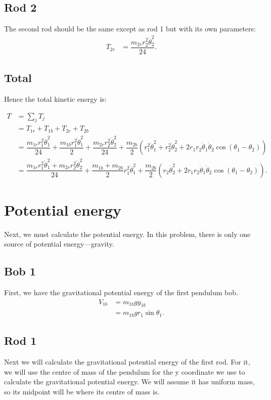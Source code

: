 \documentclass[12pt,a4paper,portrait]{article}
\begin{document}
	\subsection{Rod 2}
	The second rod should be the same except as rod 1 but with its own parameters:
	\begin{align*}
		T_{2r} &= \dfrac{m_{2r} r_2^2\dot{\theta}_2^2}{24}.
	\end{align*}
	
	\subsection{Total}
	Hence the total kinetic energy is:
	
	\begin{align*}
		T &= \sum_j T_j \\
		&= T_{1r} + T_{1b} + T_{2r} + T_{2b} \\
		&= \dfrac{m_{1r}r_1^2\dot{\theta}_1^2}{24} + \dfrac{m_{1b} r_1^2 \dot{\theta}_1^2}{2} + \dfrac{m_{2r} r_2^2\dot{\theta}_2^2}{24} + \dfrac{m_{2b}}{2} \left(r_1^2 \dot{\theta}_1^2 + r_2^2 \dot{\theta}_2^2 + 2r_1 r_2 \dot{\theta}_1 \dot{\theta}_2 \cos{\left(\theta_1-\theta_2\right)}\right) \\
		&= \dfrac{m_{1r} r_1^2 \dot{\theta}_1^2 + m_{2r}r_2^2 \dot{\theta}_2^2}{24} + \dfrac{m_{1b}+m_{2b}}{2}r_1^2 \dot{\theta}_1^2 + \dfrac{m_{2b}}{2} \left(r_2\dot{\theta}_2^2 + 2r_1 r_2 \dot{\theta}_1 \dot{\theta}_2 \cos{\left(\theta_1 - \theta_2\right)}\right).
	\end{align*}
	
	\section{Potential energy}
	Next, we must calculate the potential energy. In this problem, there is only one source of potential energy---gravity. 
	
	\subsection{Bob 1}
	First, we have the gravitational potential energy of the first pendulum bob. 
	\begin{align*}
		V_{1b} &= m_{1b} gy_{1b} \\
		&= m_{1b}gr_1 \sin{\theta_1}.
	\end{align*}
	
	\subsection{Rod 1}
	Next we will calculate the gravitational potential energy of the first rod. For it, we will use the centre of mass of the pendulum for the y coordinate we use to calculate the gravitational potential energy. We will assume it has uniform mass, so its midpoint will be where its centre of mass is. 
	
\end{document}
